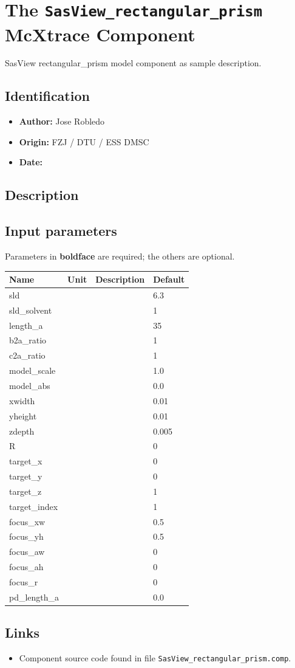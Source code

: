 \section{The \texttt{SasView\_rectangular\_prism} McXtrace Component}
SasView rectangular\_prism model component as sample description.

\subsection*{Identification}
\begin{itemize}
  \item \textbf{Author:} Jose Robledo
  \item \textbf{Origin:} FZJ / DTU / ESS DMSC
  \item \textbf{Date:} 
\end{itemize}

\subsection*{Description}


\subsection*{Input parameters}
Parameters in \textbf{boldface} are required; the others are optional.

\begin{longtable}{p{}p{}p{}p{}}
\toprule
\textbf{Name} & \textbf{Unit} & \textbf{Description} & \textbf{Default} \\
\midrule
\endhead
sld &  &  & 6.3 \\
sld\_solvent &  &  & 1 \\
length\_a &  &  & 35 \\
b2a\_ratio &  &  & 1 \\
c2a\_ratio &  &  & 1 \\
model\_scale &  &  & 1.0 \\
model\_abs &  &  & 0.0 \\
xwidth &  &  & 0.01 \\
yheight &  &  & 0.01 \\
zdepth &  &  & 0.005 \\
R &  &  & 0 \\
target\_x &  &  & 0 \\
target\_y &  &  & 0 \\
target\_z &  &  & 1 \\
target\_index &  &  & 1 \\
focus\_xw &  &  & 0.5 \\
focus\_yh &  &  & 0.5 \\
focus\_aw &  &  & 0 \\
focus\_ah &  &  & 0 \\
focus\_r &  &  & 0 \\
pd\_length\_a &  &  & 0.0 \\
\bottomrule
\end{longtable}

\subsection*{Links}
\begin{itemize}
  \item Component source code found in file \texttt{SasView\_rectangular\_prism.comp}.
\end{itemize}
